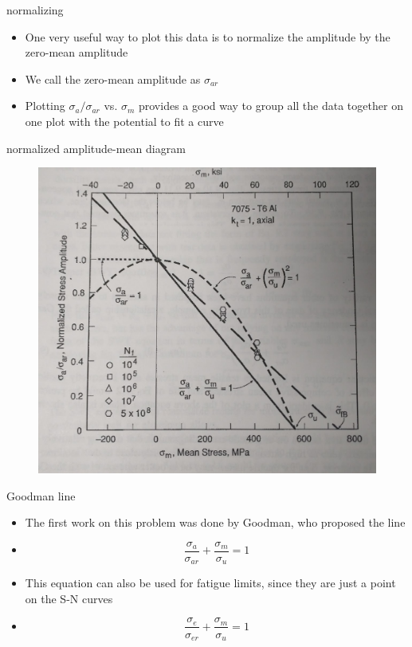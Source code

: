 \documentclass[10pt]{beamer}
\begin{document}
\begin{frame}{normalizing}
	\begin{itemize}[<+->]
		\item One very useful way to plot this data is to normalize the amplitude by the zero-mean amplitude
		\item We call the zero-mean amplitude as $\sigma_{ar}$
		\item Plotting $\sigma_{a}/\sigma_{ar}$ vs. $\sigma_m$ provides a good way to group all the data together on one plot with the potential to fit a curve
	\end{itemize}
\end{frame}

\begin{frame}{normalized amplitude-mean diagram}
\begin{figure}
\centering
\includegraphics[width=0.7\linewidth]{../Figures/normalized}
\label{fig:normalized}
\end{figure}
\end{frame}

\begin{frame}{Goodman line}
	\begin{itemize}[<+->]
		\item The first work on this problem was done by Goodman, who proposed the line
		\item[] \begin{equation}
		\frac{\sigma_a}{\sigma_{ar}} + \frac{\sigma_m}{\sigma_u} = 1
		\end{equation}
		\item This equation can also be used for fatigue limits, since they are just a point on the S-N curves
		\item[] \begin{equation}
		\frac{\sigma_e}{\sigma_{er}} + \frac{\sigma_m}{\sigma_u} = 1
		\end{equation}
	\end{itemize}
\end{frame}
\end{document}
